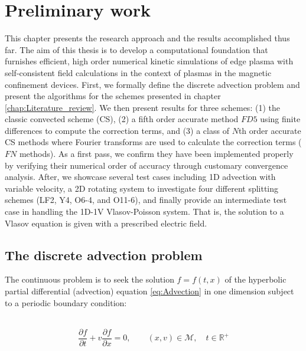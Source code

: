 \documentclass[11pt,titlepage]{report}
\begin{document}
\chapter{Preliminary work}\label{chap:Preliminary_work}

This chapter presents the research approach and the results accomplished thus far. The aim of this thesis is to develop a computational foundation that furnishes efficient, high order numerical kinetic simulations of edge plasma with self-consistent field calculations in the context of plasmas in the magnetic confinement devices. First, we formally define the discrete advection problem and present the algorithms for the schemes presented in chapter \ref{chap:Literature_review}. We then present results for three schemes: (1) the classic convected scheme (CS), (2) a fifth order accurate method $FD5$ using finite differences to compute the correction terms, and (3) a class of $N$th order accurate CS methods where Fourier transforms are used to calculate the correction terms ($FN$ methods). As a first pass, we confirm they have been implemented properly by verifying their numerical order of accuracy through customary convergence analysis. After, we showcase several test cases including 1D advection with variable velocity, a 2D rotating system to investigate four different splitting schemes (LF2, Y4, O6-4, and O11-6), and finally provide an intermediate test case in handling the 1D-1V Vlasov-Poisson system. That is, the solution to a Vlasov equation is given with a prescribed electric field.


\newpage



\section{The discrete advection problem}\label{sec:The_discrete_problem}

\indent\indent The continuous problem is to seek the solution $f = f(t,x)$ of the hyperbolic partial differential (advection) equation \eqref{eq:Advection} in one dimension subject to a periodic boundary condition:

\vspace{1em}
\\[.5em]

\begin{equation}
\frac{\partial f}{\partial t} + v\frac{\partial f}{\partial x} = 0 \label{eq:Advection_1D} , \qquad (x,v)\in\mathcal{M}, \quad t\in\mathbb{R}^+
\end{equation}
\end{document}
